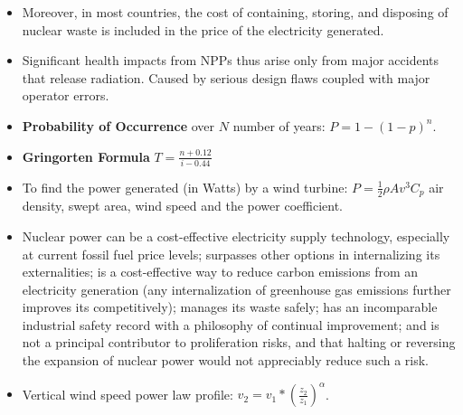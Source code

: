 \documentclass[twocolumn]{article}
\begin{document}
\begin{itemize}
\item Moreover, in most countries, the cost of containing,
storing, and disposing of nuclear waste is included in the
price of the electricity generated.
\item Significant health impacts from NPPs thus arise only from
major accidents that release radiation. Caused by
serious design flaws coupled with major operator errors.
\item \textbf{Probability of Occurrence} over $N$ number of years:
  $P=1-{(1-p)}^{n}$.
\item \textbf{Gringorten Formula} $T=\frac{n+0.12}{i-0.44}$
\item To find the power generated (in Watts) by a wind turbine:
  $P=\frac{1}{2}\rho Av^{3}C_{p}$ air density, swept area, wind speed
  and  the power coefficient.
\item Nuclear power
 can be a cost-effective electricity supply technology,
especially at current fossil fuel price levels;
 surpasses other options in internalizing its
externalities;
 is a cost-effective way to reduce carbon emissions
from an electricity generation (any internalization
of greenhouse gas emissions further improves its
competitively);
 manages its waste safely;
 has an incomparable industrial safety record with a
philosophy of continual improvement; and
 is not a principal contributor to proliferation risks,
and that halting or reversing the expansion of
nuclear power would not appreciably reduce such
a risk.
\item Vertical wind speed power law profile:
  $v_{2}=v_{1}*(\frac{z_{2}}{z_{1}})^{\alpha}$.




\end{itemize}
\end{document}
